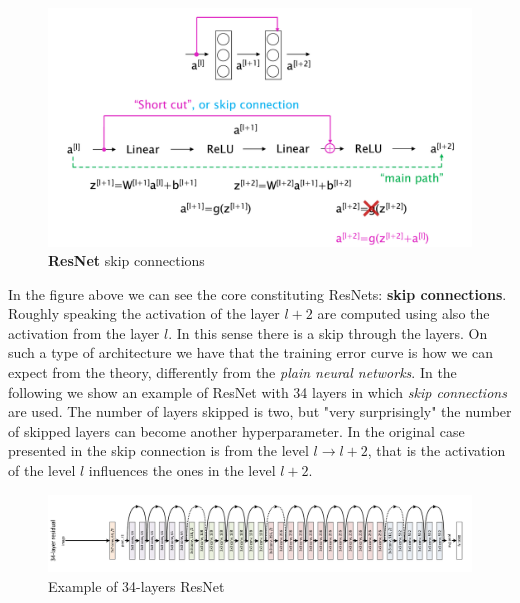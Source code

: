 \begin{figure}[h]
    \centering
    \includegraphics[scale=0.5]{img/ResNet.png}
    \caption{\textbf{ResNet} skip connections}
\end{figure}
\noindent
In the figure above we can see the core constituting ResNets: \textbf{skip connections}. Roughly speaking the activation of the layer $l+2$ are computed using also the activation from the layer $l$. In this sense there is a skip through the layers. On such a type of architecture we have that the training error curve is how we can expect from the theory, differently from the \textit{plain neural networks}. In the following we show an example of ResNet with 34 layers in which \textit{skip connections} are used. The number of layers skipped is two, but "very surprisingly" the number of skipped layers can become another hyperparameter. In the original case presented in \cite{ResNet} the skip connection is from the level $l\to{l+2}$, that is the activation of the level $l$ influences the ones in the level $l+2$.

\begin{figure}[h]
    \centering 
    \includegraphics[scale=0.6]{img/ResNet2.png}
    \caption{Example of 34-layers ResNet}
\end{figure}

